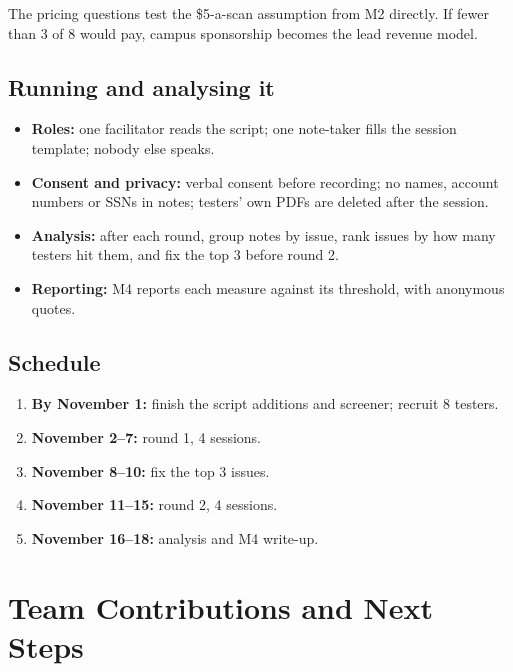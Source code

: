 \documentclass[11pt,letterpaper]{article}
\begin{document}
The pricing questions test the \$5-a-scan assumption from M2 directly. If fewer than 3 of 8 would pay, campus sponsorship becomes the lead revenue model.

\subsection{Running and analysing it}

\begin{itemize}
  \item \textbf{Roles:} one facilitator reads the script; one note-taker fills the session template; nobody else speaks.
  \item \textbf{Consent and privacy:} verbal consent before recording; no names, account numbers or SSNs in notes; testers' own PDFs are deleted after the session.
  \item \textbf{Analysis:} after each round, group notes by issue, rank issues by how many testers hit them, and fix the top 3 before round 2.
  \item \textbf{Reporting:} M4 reports each measure against its threshold, with anonymous quotes.
\end{itemize}

\subsection{Schedule}

\begin{enumerate}
  \item \textbf{By November 1:} finish the script additions and screener; recruit 8 testers.
  \item \textbf{November 2--7:} round 1, 4 sessions.
  \item \textbf{November 8--10:} fix the top 3 issues.
  \item \textbf{November 11--15:} round 2, 4 sessions.
  \item \textbf{November 16--18:} analysis and M4 write-up.
\end{enumerate}

\section{Team Contributions and Next Steps}
\end{document}
